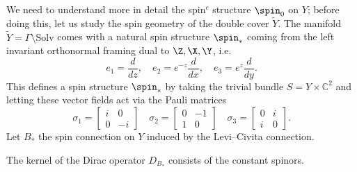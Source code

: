We need to understand more in detail the spin$^c$ structure $\spin_0$ on $Y$; before doing this, let us study the spin geometry of the double cover $\tilde{Y}$. The manifold $\tilde{Y}=\Gamma\setminus\mathrm{Solv}$ comes with a natural spin structure $\spin_*$ coming from the left invariant orthonormal framing dual to $\Z,\X,\Y$, i.e.
\[
e_1=\frac{d}{dz},\quad e_2=e^{-z}\frac{d}{dx},\quad e_3=e^z\frac{d}{dy}.
\]
This defines a spin structure $\spin_*$ by taking the trivial bundle $S=Y\times \mathbb{C}^2$ and letting these vector fields act via the Pauli matrices
\[
\sigma_1=
\begin{bmatrix}
i&0\\
0&-i
\end{bmatrix}
\quad
\sigma_2=
\begin{bmatrix}
0&-1\\
1&0
\end{bmatrix}
\quad
\sigma_3=
\begin{bmatrix}
0&i\\
i&0
\end{bmatrix}.
\]
Let $B_*$ the spin connection on $Y$ induced by the Levi--Civita connection.



\begin{lemm}\label{harmonic}
The kernel of the Dirac operator $D_{B_*}$ consists of the constant spinors.
\end{lemm}


